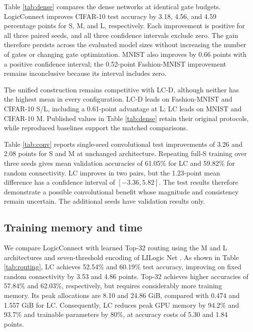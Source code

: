 Table \ref{tab:dense} compares the dense networks at identical gate budgets. LogicConnect improves CIFAR-10 test accuracy by 3.18, 4.56, and 4.59 percentage points for S, M, and L, respectively. Each improvement is positive for all three paired seeds, and all three confidence intervals exclude zero. The gain therefore persists across the evaluated model sizes without increasing the number of gates or changing gate optimization. MNIST also improves by 0.66 points with a positive confidence interval; the 0.52-point Fashion-MNIST improvement remains inconclusive because its interval includes zero.



The unified construction remains competitive with LC-D, although neither has the highest mean in every configuration. LC-D leads on Fashion-MNIST and CIFAR-10 S/L, including a 0.61-point advantage at L; LC leads on MNIST and CIFAR-10 M. Published values in Table \ref{tab:dense} retain their original protocols, while reproduced baselines support the matched comparisons.

Table \ref{tab:conv} reports single-seed convolutional test improvements of 3.26 and 2.08 points for S and M at unchanged architecture. Repeating full-S training over three seeds gives mean validation accuracies of 61.05\% for LC and 59.82\% for random connectivity. LC improves in two pairs, but the 1.23-point mean difference has a confidence interval of $[-3.36,5.82]$. The test results therefore demonstrate a possible convolutional benefit whose magnitude and consistency remain uncertain. The additional seeds have validation results only.



\subsection{Training memory and time}

We compare LogicConnect with learned Top-32 routing using the M and L architectures and seven-threshold encoding of LILogic Net \cite{fojcik2026}. As shown in Table \ref{tab:routing}, LC achieves 52.54\% and 60.19\% test accuracy, improving on fixed random connectivity by 3.53 and 4.86 points. Top-32 achieves higher accuracies of 57.84\% and 62.03\%, respectively, but requires considerably more training memory. Its peak allocations are 8.10 and 24.86 GiB, compared with 0.474 and 1.557 GiB for LC. Consequently, LC reduces peak GPU memory by 94.2\% and 93.7\% and trainable parameters by 80\%, at accuracy costs of 5.30 and 1.84 points.




